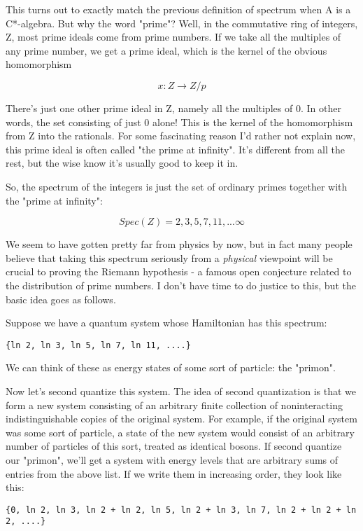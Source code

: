 This turns out to exactly match the previous definition of spectrum when A 
is a C*-algebra.  But why the word "prime"?  Well, in the commutative 
ring of integers, Z, most prime ideals come from prime numbers.  If we 
take all the multiples of any prime number, we get a prime ideal, which 
is the kernel of the obvious homomorphism

$$
x: Z \to  Z/p
$$
    

There's just one other prime ideal in Z, namely all the multiples of
0.  In other words, the set consisting of just 0 alone!  This is the
kernel of the homomorphism from Z into the rationals.  For some
fascinating reason I'd rather not explain now, this prime ideal is
often called "the prime at infinity".  It's different from all the
rest, but the wise know it's usually good to keep it in.

So, the spectrum of the integers is just the set of ordinary primes
together with the "prime at infinity":

$$
Spec(Z) = {2, 3, 5, 7, 11, ... \infty }
$$
    

We seem to have gotten pretty far from physics by now, but in fact many 
people believe that taking this spectrum seriously from a \emph{physical}
viewpoint will be crucial to proving the Riemann hypothesis - a famous 
open conjecture related to the distribution of prime numbers.  I don't 
have time to do justice to this, but the basic idea goes as follows.  

Suppose we have a quantum system whose Hamiltonian has this spectrum:

\begin{verbatim}
{ln 2, ln 3, ln 5, ln 7, ln 11, ....}
\end{verbatim}
    
We can think of these as energy states of some sort of particle: the
"primon".  

Now let's second quantize this system.  The idea of second quantization 
is that we form a new system consisting of an arbitrary finite collection 
of noninteracting indistinguishable copies of the original system.  For 
example, if the original system was some sort of particle, a state of 
the new system would consist of an arbitrary number of particles of 
this sort, treated as identical bosons.  If second quantize our "primon",
we'll get a system with energy levels that are arbitrary sums of entries 
from the above list.  If we write them in increasing order, they look 
like this:

\begin{verbatim}
{0, ln 2, ln 3, ln 2 + ln 2, ln 5, ln 2 + ln 3, ln 7, ln 2 + ln 2 + ln 2, ....}
\end{verbatim}
    

